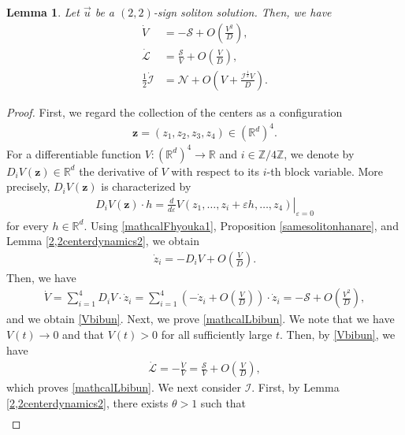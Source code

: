 \documentclass[10pt,a4paper]{amsart}
\newtheorem{lemma}[theorem]{Lemma}
\numberwithin{equation}{section}
\begin{document}
\begin{lemma}\label{mathcalbibunlem}
Let $\vec{u}$ be a $(2,2)$-sign soliton solution. Then, we have
\begin{align}
\dot{V}&=-\mathcal{S}+O\left(\frac{V^2}{D}\right),\label{Vbibun}
\\
\dot{\mathcal{L}}&=\frac{\mathcal{S}}{V}+O\left(\frac{V}{D}\right),\label{mathcalLbibun}
\\
\frac{1}{2}\dot{\mathcal{I}}&=\mathcal{N}+O\left(V+\frac{\mathcal{I}^{\frac{1}{2}}V}{D}\right).\label{mathcalIbibun}
\end{align}
\end{lemma}
\begin{proof}
First, we regard the collection of the centers as a configuration
\begin{align*}
\boldsymbol{z}
=(z_1,z_2,z_3,z_4)\in(\mathbb{R}^d)^4.
\end{align*}
For a differentiable function $V:(\mathbb{R}^d)^4\to\mathbb{R}$ and $i\in\mathbb{Z}/4\mathbb{Z}$, we denote by $D_iV(\boldsymbol{z})\in\mathbb{R}^d$ the derivative of $V$ with respect to its $i$-th block variable. More precisely, $D_iV(\boldsymbol{z})$ is characterized by
\begin{align}\label{DiVdef}
D_iV(\boldsymbol{z})\cdot h
=
\left.
\frac{d}{d\varepsilon}
V(z_1,\ldots,z_i+\varepsilon h,\ldots,z_4)
\right|_{\varepsilon=0}
\end{align}
for every $h\in\mathbb{R}^d$. Using \eqref{mathcalFhyouka1}, Proposition \ref{samesolitonhanare},
and Lemma \ref{2,2centerdynamics2}, we obtain
\begin{align}
\dot{z}_i=-D_iV+O\left(\frac{V}{D}\right).
\end{align}
Then, we have
\begin{align*}
\dot{V}=\sum_{i=1}^4D_iV\cdot \dot{z}_i=\sum_{i=1}^4 \left(-\dot{z}_i+O\left(\frac{V}{D}\right)\right)\cdot \dot{z}_i=-\mathcal{S}+O\left(\frac{V^2}{D}\right),
\end{align*}
and we obtain \eqref{Vbibun}. Next, we prove \eqref{mathcalLbibun}. We note that we have $V(t)\to 0$ and that $V(t)>0$ for all sufficiently large $t$. Then, by \eqref{Vbibun}, we have
\begin{align*}
\dot{\mathcal{L}}=-\frac{\dot{V}}{V}=\frac{\mathcal{S}}{V}+O\left(\frac{V}{D}\right),
\end{align*}
which proves \eqref{mathcalLbibun}. We next consider $\mathcal{I}$. First, by Lemma \ref{2,2centerdynamics2}, there exists $\theta>1$ such that 
\begin{align*}

\end{align*}
\end{proof}
\end{document}
